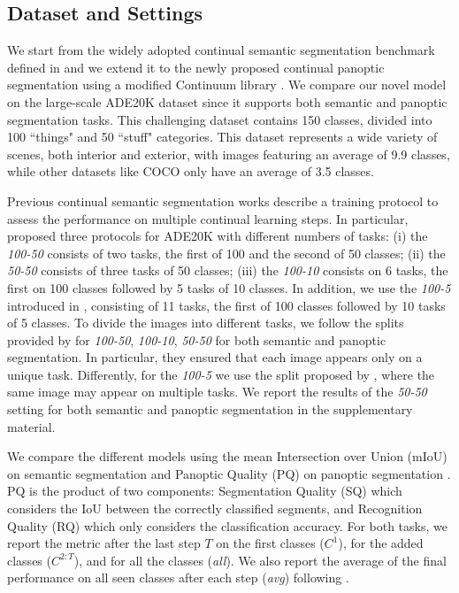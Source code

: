 \documentclass[10pt,twocolumn,letterpaper]{article}
\begin{document}
 
\subsection{Dataset and Settings}
We start from the widely adopted continual semantic segmentation benchmark defined in \cite{cermelli2020modelingthebackground} and we extend it to the newly proposed continual panoptic segmentation using a modified Continuum library \cite{douillardlesort2021continuum}. 
We compare our novel model on the large-scale ADE20K \cite{zhou2017adedataset} dataset since it supports both semantic and panoptic segmentation tasks. This challenging dataset contains 150 classes, divided into 100 “things" and 50 “stuff" categories. This dataset represents a wide variety of scenes, both interior and exterior, with images featuring an average of 9.9 classes, while other datasets like COCO \cite{lin2014mscocodataset} only have an average of 3.5 classes.

Previous continual semantic segmentation works \cite{douillard2020plop, cermelli2020modelingthebackground} describe a training protocol to assess the performance on multiple continual learning steps. In particular, \cite{cermelli2020modelingthebackground} proposed three protocols for ADE20K with different numbers of tasks: (i) the \textit{100-50} consists of two tasks, the first of 100 and the second of 50 classes; (ii) the \textit{50-50} consists of three tasks of 50 classes; (iii) the \textit{100-10} consists on 6 tasks, the first on 100 classes followed by 5 tasks of 10 classes. In addition, we use the \textit{100-5} introduced in \cite{douillard2020plop}, consisting of 11 tasks, the first of 100 classes followed by 10 tasks of 5 classes.
To divide the images into different tasks, we follow the splits provided by \cite{cermelli2020modelingthebackground} for \textit{100-50}, \textit{100-10}, \textit{50-50} for both semantic and panoptic segmentation. In particular, they ensured that each image appears only on a unique task. Differently, for the \textit{100-5} we use the split proposed by \cite{douillard2020plop}, where the same image may appear on multiple tasks. 
We report the results of the \textit{50-50} setting for both semantic and panoptic segmentation in the supplementary material.

We compare the different models using the mean Intersection over Union (mIoU) on semantic segmentation \cite{everingham2015pascalvoc} and Panoptic Quality (PQ) on panoptic segmentation \cite{kirillov2019panoptic}. PQ is the product of two components: Segmentation Quality (SQ) which considers the IoU between the correctly classified segments, and Recognition Quality (RQ) which only considers the classification accuracy. For both tasks, we report the metric after the last step $T$ on the first classes ($C^1$), for the added classes ($C^{2:T}$), and for all the classes (\textit{all}). We also report the average of the final performance on all seen classes after each step (\textit{avg}) following \cite{douillard2020plop}.
\end{document}
